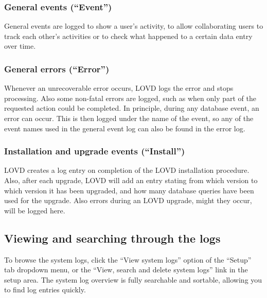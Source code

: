 \documentclass[a4paper,oneside,openany,12pt]{memoir}
\begin{document}
\subsubsection{General events (``Event'')}
General events are logged to show a user's activity, to allow collaborating users to track each other's
 activities or to check what happened to a certain data entry over time.


\subsubsection{General errors (``Error'')}
Whenever an unrecoverable error occurs, LOVD logs the error and stops processing.
Also some non-fatal errors are logged, such as when only part of the requested action could be completed.
In principle, during any database event, an error can occur.
This is then logged under the name of the event, so any of the event names used in the general event log can also be found in the error log.

\subsubsection{Installation and upgrade events (``Install'')}
LOVD creates a log entry on completion of the LOVD installation procedure.
Also, after each upgrade, LOVD will add an entry stating from which version to which version it has been upgraded,
 and how many database queries have been used for the upgrade.
Also errors during an LOVD upgrade, might they occur, will be logged here.



\subsection{Viewing and searching through the logs}
To browse the system logs, click the ``View system logs'' option of the ``Setup'' tab dropdown menu,
 or the ``View, search and delete system logs'' link in the setup area.
The system log overview is fully searchable and sortable, allowing you to find log entries quickly.
\end{document}
